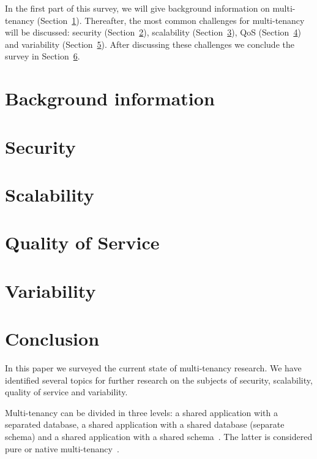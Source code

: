 \documentclass{article}
\begin{document}
In the first part of this survey, we will give background information on multi-tenancy (Section~\ref{sec:bg}). Thereafter, the most common challenges for multi-tenancy will be discussed: security (Section~\ref{sec:security}), scalability (Section~\ref{sec:scalability}), \ac{QoS} (Section~\ref{sec:qos}) and variability (Section~\ref{sec:variability}). After discussing these challenges we conclude the survey in Section~\ref{sec:conclusion}.

\section{Background information}
\label{sec:bg}


\section{Security}
\label{sec:security}


\section{Scalability}
\label{sec:scalability}


\section{Quality of Service}
\label{sec:qos}


\section{Variability}
\label{sec:variability}


\section{Conclusion}
\label{sec:conclusion}
In this paper we surveyed the current state of multi-tenancy research.
We have identified several topics for further research on the subjects of security, scalability, quality of service and variability.

Multi-tenancy can be divided in three levels: a shared application with a separated database, a shared application with a shared database (separate schema) and a shared application with a shared schema~\cite{bezemer2010multi}. The latter is considered pure or native multi-tenancy~\cite{bezemer2010multi,lin2009feedback,aulbach2009comparison}.
\end{document}
